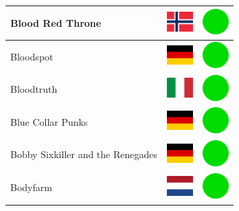\documentclass[12pt, a4paper, twoside]{report}
\begin{document}
\begin{center}
\begin{longtable}{|p{5cm}|p{2cm}|p{2cm}|}
Blood Red Throne & \includegraphics[width=1cm]{4x3/no} & \includegraphics[width=1cm]{likes/y} \\ \hline
Bloodspot & \includegraphics[width=1cm]{4x3/de} & \includegraphics[width=1cm]{likes/y} \\ \hline
Bloodtruth & \includegraphics[width=1cm]{4x3/it} & \includegraphics[width=1cm]{likes/y} \\ \hline
Blue Collar Punks & \includegraphics[width=1cm]{4x3/de} & \includegraphics[width=1cm]{likes/y} \\ \hline
Bobby Sixkiller and the Renegades & \includegraphics[width=1cm]{4x3/de} & \includegraphics[width=1cm]{likes/y} \\ \hline
Bodyfarm & \includegraphics[width=1cm]{4x3/nl} & \includegraphics[width=1cm]{likes/y} \\ \hline

\end{longtable}
\end{center}
\end{document}

